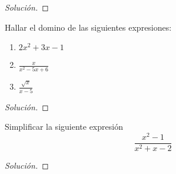 \documentclass[a4,11pt]{aleph-notas}
\begin{document}
\begin{proof}[Solución]\hspace{0pt}
    
\end{proof}

\begin{ejer}
	Hallar el domino de las siguientes expresiones:
	\begin{enumerate}[label=\textit{\alph*)}]
		\item $2x^2 + 3x -1$
		\item $\frac{x}{x^2 - 5x + 6}$
		\item $\frac{\sqrt{x}}{x-5}$
	\end{enumerate}
\end{ejer}

\begin{proof}[Solución]\hspace{0pt}
	
\end{proof}

\begin{ejer}
	Simplificar la siguiente expresi\'on 
	$$
	\frac{x^2 - 1}{x^2 + x - 2}
	$$
\end{ejer}
\begin{proof}[Solución]\hspace{0pt}
	
\end{proof}
\end{document}
